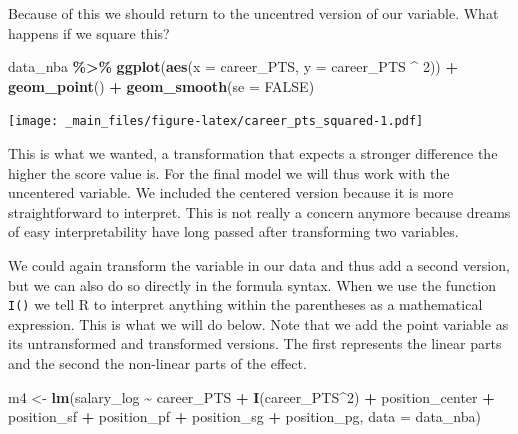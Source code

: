 \documentclass[
]{book}
\newenvironment{Shaded}{\begin{snugshade}}{\end{snugshade}}
\newcommand{\AttributeTok}[1]{\textcolor[rgb]{0.13,0.29,0.53}{#1}}
\newcommand{\ConstantTok}[1]{\textcolor[rgb]{0.56,0.35,0.01}{#1}}
\newcommand{\DecValTok}[1]{\textcolor[rgb]{0.00,0.00,0.81}{#1}}
\newcommand{\FunctionTok}[1]{\textcolor[rgb]{0.13,0.29,0.53}{\textbf{#1}}}
\newcommand{\NormalTok}[1]{#1}
\newcommand{\OtherTok}[1]{\textcolor[rgb]{0.56,0.35,0.01}{#1}}
\newcommand{\SpecialCharTok}[1]{\textcolor[rgb]{0.81,0.36,0.00}{\textbf{#1}}}
\begin{document}
Because of this we should return to the uncentred version of our variable. What
happens if we square this?

\begin{Shaded}
\begin{Highlighting}[]
\NormalTok{data\_nba }\SpecialCharTok{\%\textgreater{}\%} 
  \FunctionTok{ggplot}\NormalTok{(}\FunctionTok{aes}\NormalTok{(}\AttributeTok{x =}\NormalTok{ career\_PTS, }\AttributeTok{y =}\NormalTok{ career\_PTS }\SpecialCharTok{\^{}} \DecValTok{2}\NormalTok{)) }\SpecialCharTok{+}
  \FunctionTok{geom\_point}\NormalTok{() }\SpecialCharTok{+}
  \FunctionTok{geom\_smooth}\NormalTok{(}\AttributeTok{se =} \ConstantTok{FALSE}\NormalTok{)}
\end{Highlighting}
\end{Shaded}

\texttt{[image: \_main\_files/figure-latex/career\_pts\_squared-1.pdf]}

This is what we wanted, a transformation that expects a stronger difference the
higher the score value is. For the final model we will thus work with the
uncentered variable. We included the centered version because it is more
straightforward to interpret. This is not really a concern anymore because
dreams of easy interpretability have long passed after transforming two variables.

We could again transform the variable in our data and thus add a second version,
but we can also do so directly in the formula syntax. When we use the function
\texttt{I()} we tell R to interpret anything within the parentheses as a mathematical
expression. This is what we will do below. Note that we add the point variable
as its untransformed and transformed versions. The first represents the linear
parts and the second the non-linear parts of the effect.

\begin{Shaded}
\begin{Highlighting}[]
\NormalTok{m4 }\OtherTok{\textless{}{-}} \FunctionTok{lm}\NormalTok{(salary\_log }\SpecialCharTok{\textasciitilde{}}\NormalTok{ career\_PTS }\SpecialCharTok{+} \FunctionTok{I}\NormalTok{(career\_PTS}\SpecialCharTok{\^{}}\DecValTok{2}\NormalTok{) }\SpecialCharTok{+}\NormalTok{ position\_center }\SpecialCharTok{+}\NormalTok{ position\_sf }\SpecialCharTok{+}\NormalTok{ position\_pf }\SpecialCharTok{+}\NormalTok{ position\_sg }\SpecialCharTok{+}\NormalTok{ position\_pg, }\AttributeTok{data =}\NormalTok{ data\_nba)}
\end{Highlighting}
\end{Shaded}
\end{document}
